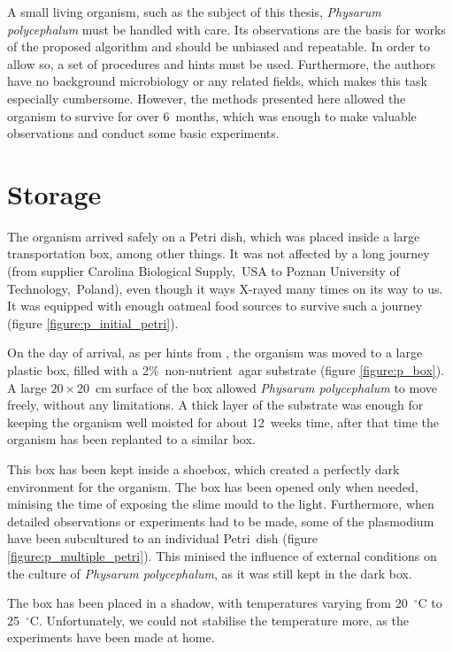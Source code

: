 \documentclass[english,a4paper,twoside]{ppfcmthesis}
\begin{document}
A small living organism, such as the subject of this thesis, \textit{Physarum polycephalum} must be handled with care. Its observations are the basis for works of the proposed algorithm and should be unbiased and repeatable. In order to allow so, a set of procedures and hints must be used. Furthermore, the authors have no background microbiology or any related fields, which makes this task especially cumbersome. However, the methods presented here allowed the organism to survive for over 6~months, which was enough to make valuable observations and conduct some basic experiments.


\section*{Storage}

The organism arrived safely on a Petri dish, which was placed inside a large transportation box, among other things. It was not affected by a long journey (from supplier Carolina Biological Supply,~USA to Poznan University of Technology,~Poland), even though it ways X-rayed many times on its way to us. It was equipped with enough oatmeal food sources to survive such a journey (figure \ref{figure:p_initial_petri}).

On the day of arrival, as per hints from \cite{adamatzky2010physarum}, the organism was moved to a large plastic box, filled with a 2\%~non-nutrient~agar substrate (figure \ref{figure:p_box}). A large $20\times20$~cm surface of the box allowed \textit{Physarum polycephalum} to move freely, without any limitations. A thick layer of the substrate was enough for keeping the organism well moisted for about 12~weeks time, after that time the organism has been replanted to a similar box.

This box has been kept inside a shoebox, which created a perfectly dark environment for the organism. The box has been opened only when needed, minising the time of exposing the slime mould to the light. Furthermore, when detailed observations or experiments had to be made, some of the plasmodium have been subcultured to an individual Petri~dish (figure \ref{figure:p_multiple_petri}). This minised the influence of external conditions on the culture of \textit{Physarum polycephalum}, as it was still kept in the dark box. 

The box has been placed in a shadow, with temperatures varying from 20~$^{\circ}$C to 25~$^{\circ}$C. Unfortunately, we could not stabilise the temperature more, as the experiments have been made at home.
\end{document}
